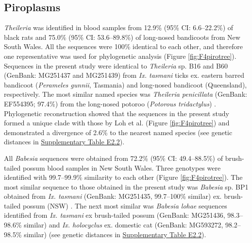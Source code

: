 \documentclass[a4paper, nobind]{templates/ociamthesis}
\begin{document}
\hypertarget{piroplasms}{%
\subsection{Piroplasms}\label{piroplasms}}

\emph{Theileria} was identified in blood samples from 12.9\% (95\% CI: 6.6--22.2\%) of black rats and 75.0\% (95\% CI: 53.6--89.8\%) of long-nosed bandicoots from New South Wales.
All the sequences were 100\% identical to each other, and therefore one representative was used for phylogenetic analysis (Figure \ref{fig:F4pirotree}).
Sequences in the present study were identical to \emph{Theileria} sp. B16 and B60 (GenBank: MG251437 and MG251439) from \emph{Ix. tasmani} ticks ex. eastern barred bandicoot (\emph{Perameles gunnii}, Tasmania) and long-nosed bandicoot (Queensland), respectively.
The most similar named species was \emph{Theileria penicillata} (GenBank: EF554395; 97.4\%) from the long-nosed potoroo (\emph{Potorous tridactylus}) \autocite{leeTheileriaGilbertiSp2009}.
Phylogenetic reconstruction showed that the sequences in the present study formed a unique clade with those by Loh et al. \autocite*{lohMolecularSurveillancePiroplasms2018} (Figure \ref{fig:F4pirotree}) and demonstrated a divergence of 2.6\% to the nearest named species (see genetic distances in \protect\hyperlink{supplementary-table-e2.2}{Supplementary Table E2.2}).

All \emph{Babesia} sequences were obtained from 72.2\% (95\% CI: 49.4--88.5\%) of brush-tailed possum blood samples in New South Wales. Three genotypes were identified with 99.7--99.9\% similarity to each other (Figure \ref{fig:F4pirotree}).
The most similar sequence to those obtained in the present study was \emph{Babesia} sp. BP1 obtained from \emph{Ix. tasmani} (GenBank: MG251435, 99.7--100\% similar) ex. brush-tailed possum (NSW) \autocite{lohMolecularSurveillancePiroplasms2018}.
The next most similar was \emph{Babesia lohae} sequences identified from \emph{Ix. tasmani} ex brush-tailed possum (GenBank: MG251436, 98.3--98.6\% similar) \autocite{lohMolecularSurveillancePiroplasms2018} and \emph{Ix. holocyclus} ex. domestic cat (GenBank: MG593272, 98.2--98.5\% similar) \autocite{greayEndemicExoticNovel2018} (see genetic distances in \protect\hyperlink{supplementary-table-e2.2}{Supplementary Table E2.2}).
\end{document}
